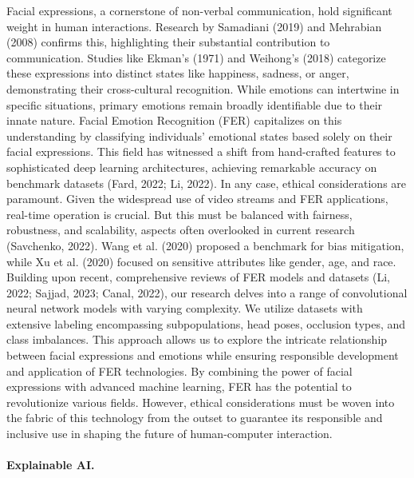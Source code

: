 Facial expressions, a cornerstone of non-verbal communication, hold significant weight in human interactions. Research by Samadiani (2019) and Mehrabian (2008) confirms this, highlighting their substantial contribution to communication. Studies like Ekman's (1971) and Weihong's (2018) categorize these expressions into distinct states like happiness, sadness, or anger, demonstrating their cross-cultural recognition. While emotions can intertwine in specific situations, primary emotions remain broadly identifiable due to their innate nature.
Facial Emotion Recognition (FER) capitalizes on this understanding by classifying individuals' emotional states based solely on their facial expressions. This field has witnessed a shift from hand-crafted features to sophisticated deep learning architectures, achieving remarkable accuracy on benchmark datasets (Fard, 2022; Li, 2022). In any case, ethical considerations are paramount. Given the widespread use of video streams and FER applications, real-time operation is crucial. But this must be balanced with fairness, robustness, and scalability, aspects often overlooked in current research (Savchenko, 2022). Wang et al. (2020) proposed a benchmark for bias mitigation, while Xu et al. (2020) focused on sensitive attributes like gender, age, and race.
Building upon recent, comprehensive reviews of FER models and datasets (Li, 2022; Sajjad, 2023; Canal, 2022), our research delves into a range of convolutional neural network models with varying complexity. We utilize datasets with extensive labeling encompassing subpopulations, head poses, occlusion types, and class imbalances. This approach allows us to explore the intricate relationship between facial expressions and emotions while ensuring responsible development and application of FER technologies.
By combining the power of facial expressions with advanced machine learning, FER has the potential to revolutionize various fields. However, ethical considerations must be woven into the fabric of this technology from the outset to guarantee its responsible and inclusive use in shaping the future of human-computer interaction.

\paragraph{Explainable AI.}

